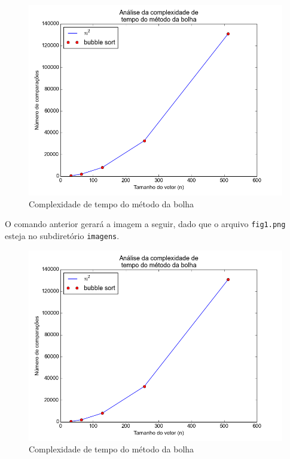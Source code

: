 \documentclass[12pt,a4paper,twoside]{report}
\begin{document}
\begin{latex}
\begin{figure}[!ht]
\centering
\includegraphics[scale=0.5]{imagens/bolha1.png}
\caption{Complexidade de tempo do método da bolha \label{fig:1}}
\end{figure}
\end{latex}

O comando anterior gerará a imagem a seguir, dado que o arquivo \texttt{fig1.png} esteja no subdiretório \texttt{imagens}.
\begin{figure}[!h]
\centering
\includegraphics[scale=0.5]{../imagens/bolha1.png}
\caption{Complexidade de tempo do método da bolha \label{fig:1}}
\end{figure}
\end{document}
